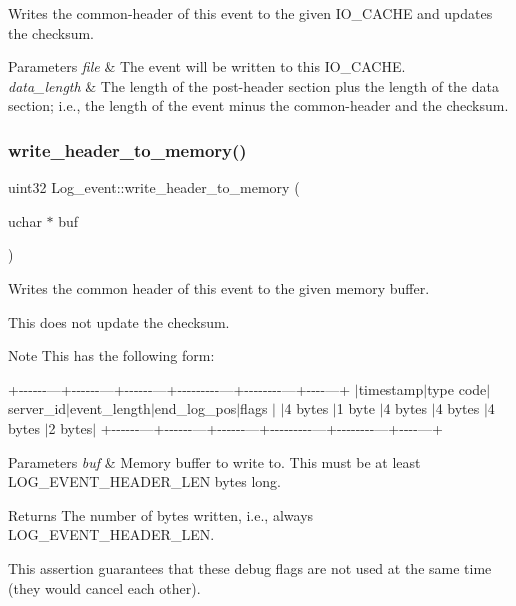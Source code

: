 Writes the common-\/header of this event to the given I\+O\+\_\+\+C\+A\+C\+HE and updates the checksum.


\begin{DoxyParams}{Parameters}
{\em file} & The event will be written to this I\+O\+\_\+\+C\+A\+C\+HE.\\
\hline
{\em data\+\_\+length} & The length of the post-\/header section plus the length of the data section; i.\+e., the length of the event minus the common-\/header and the checksum. \\
\hline
\end{DoxyParams}
\mbox{\label{classLog__event_a24fdaf3da904d7f1e2723d8a853f8dd8}} 
\subsubsection{\texorpdfstring{write\+\_\+header\+\_\+to\+\_\+memory()}{write\_header\_to\_memory()}}
{\footnotesize\ttfamily uint32 Log\+\_\+event\+::write\+\_\+header\+\_\+to\+\_\+memory (\begin{DoxyParamCaption}\item[{uchar $\ast$}]{buf }\end{DoxyParamCaption})\hspace{0.3cm}{\ttfamily [protected]}}

Writes the common header of this event to the given memory buffer.

This does not update the checksum.

\begin{DoxyNote}{Note}
This has the following form\+:
\end{DoxyNote}
+-\/-\/-\/-\/-\/-\/---+-\/-\/-\/-\/-\/-\/---+-\/-\/-\/-\/-\/-\/---+-\/-\/-\/-\/-\/-\/-\/-\/-\/---+-\/-\/-\/-\/-\/-\/-\/-\/---+-\/-\/-\/-\/---+ $\vert$timestamp$\vert$type code$\vert$server\+\_\+id$\vert$event\+\_\+length$\vert$end\+\_\+log\+\_\+pos$\vert$flags $\vert$ $\vert$4 bytes $\vert$1 byte $\vert$4 bytes $\vert$4 bytes $\vert$4 bytes $\vert$2 bytes$\vert$ +-\/-\/-\/-\/-\/-\/---+-\/-\/-\/-\/-\/-\/---+-\/-\/-\/-\/-\/-\/---+-\/-\/-\/-\/-\/-\/-\/-\/-\/---+-\/-\/-\/-\/-\/-\/-\/-\/---+-\/-\/-\/-\/---+


\begin{DoxyParams}{Parameters}
{\em buf} & Memory buffer to write to. This must be at least L\+O\+G\+\_\+\+E\+V\+E\+N\+T\+\_\+\+H\+E\+A\+D\+E\+R\+\_\+\+L\+EN bytes long.\\
\hline
\end{DoxyParams}
\begin{DoxyReturn}{Returns}
The number of bytes written, i.\+e., always L\+O\+G\+\_\+\+E\+V\+E\+N\+T\+\_\+\+H\+E\+A\+D\+E\+R\+\_\+\+L\+EN. 
\end{DoxyReturn}
This assertion guarantees that these debug flags are not used at the same time (they would cancel each other).

